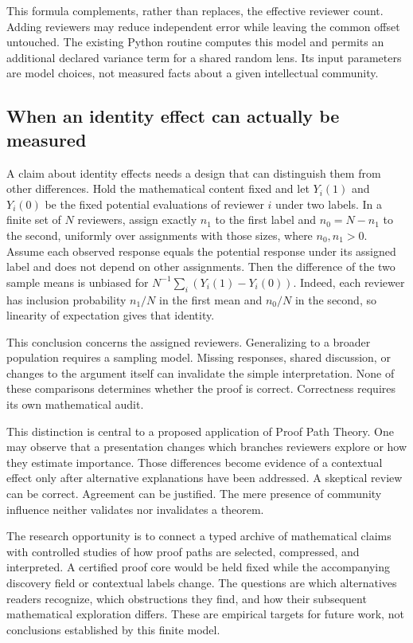 This formula complements, rather than replaces, the effective reviewer count. Adding reviewers may reduce independent error while leaving the common offset untouched. The existing Python routine  computes this model and permits an additional declared variance term for a shared random lens. Its input parameters are model choices, not measured facts about a given intellectual community.

\subsection{When an identity effect can actually be measured}

A claim about identity effects needs a design that can distinguish them from other differences. Hold the mathematical content fixed and let $Y_i(1)$ and $Y_i(0)$ be the fixed potential evaluations of reviewer $i$ under two labels. In a finite set of $N$ reviewers, assign exactly $n_1$ to the first label and $n_0=N-n_1$ to the second, uniformly over assignments with those sizes, where $n_0,n_1>0$. Assume each observed response equals the potential response under its assigned label and does not depend on other assignments. Then the difference of the two sample means is unbiased for $N^{-1}\sum_i(Y_i(1)-Y_i(0))$. Indeed, each reviewer has inclusion probability $n_1/N$ in the first mean and $n_0/N$ in the second, so linearity of expectation gives that identity.

This conclusion concerns the assigned reviewers. Generalizing to a broader population requires a sampling model. Missing responses, shared discussion, or changes to the argument itself can invalidate the simple interpretation. None of these comparisons determines whether the proof is correct. Correctness requires its own mathematical audit.

This distinction is central to a proposed application of Proof Path Theory. One may observe that a presentation changes which branches reviewers explore or how they estimate importance. Those differences become evidence of a contextual effect only after alternative explanations have been addressed. A skeptical review can be correct. Agreement can be justified. The mere presence of community influence neither validates nor invalidates a theorem.

The research opportunity is to connect a typed archive of mathematical claims with controlled studies of how proof paths are selected, compressed, and interpreted. A certified proof core would be held fixed while the accompanying discovery field or contextual labels change. The questions are which alternatives readers recognize, which obstructions they find, and how their subsequent mathematical exploration differs. These are empirical targets for future work, not conclusions established by this finite model.

